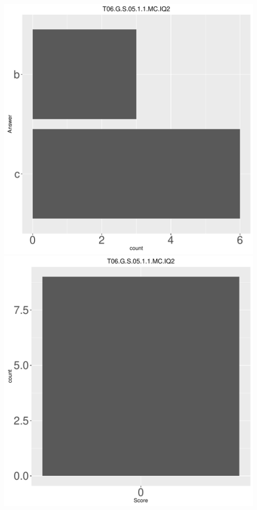 \documentclass[12pt,english,nohyper]{tufte-handout}\usepackage[]{graphicx}\usepackage[]{color}
\begin{document}
\begin{center} \includegraphics[width=.45\linewidth]{Topic06_AB_77_answer} \includegraphics[width=.45\linewidth]{Topic06_AB_77_score} \end{center} 
\end{document}
